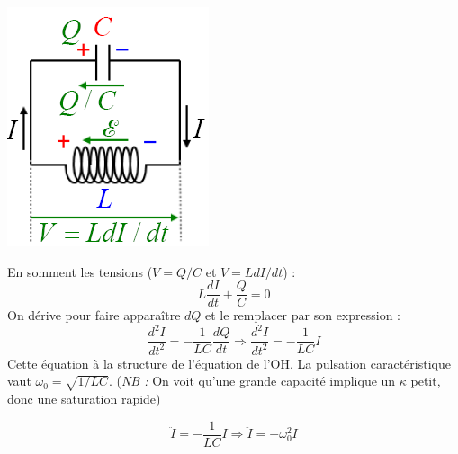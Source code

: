 \documentclass	[11pt, a4paper, openany]{book}
\begin{document}
	\begin{center}
		\includegraphics[scale=0.45]{oo/image14.png}
	\end{center}
	
	En somment les tensions ($V = Q/C$ et $V = L dI/dt$) :
	\begin{equation}
		L\frac{dI}{dt} + \frac{Q}{C} = 0
	\end{equation}
	On dérive pour faire apparaître $dQ$ et le remplacer par son expression :
	\begin{equation}
		\frac{d^2I}{dt^2} = -\frac{1}{LC}\frac{dQ}{dt} \Rightarrow \frac{d^2I}{dt^2} = - \frac{1}{LC}I
	\end{equation}
	Cette équation à la structure de l'équation de l'OH. La pulsation caractéristique vaut $\omega_0 = \sqrt{1/LC}$. (\textit{NB :} On voit qu'une grande capacité implique un $\kappa$ petit, donc une saturation rapide)
	
	\begin{equation}
		\ddot{I} = -\frac{1}{LC}I \Rightarrow \ddot{I} = -\omega_0^2I
	\end{equation}
	
\end{document}
